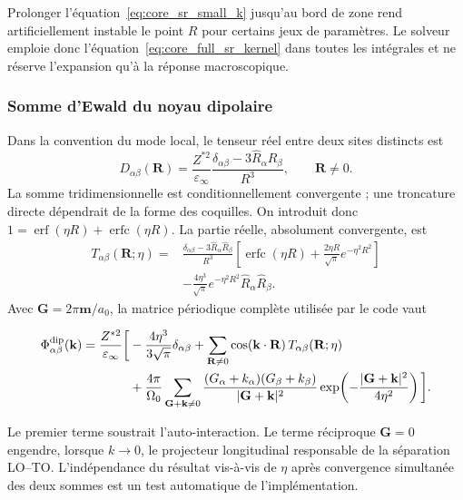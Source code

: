 Prolonger l'équation~\eqref{eq:core_sr_small_k} jusqu'au bord de zone rend
artificiellement instable le point $R$ pour certains jeux de paramètres. Le
solveur emploie donc l'équation~\eqref{eq:core_full_sr_kernel} dans toutes les
intégrales et ne réserve l'expansion qu'à la réponse macroscopique.

\subsubsection{Somme d'Ewald du noyau dipolaire}
\label{sec:core_dipolar_kernel}

Dans la convention du mode local, le tenseur réel entre deux sites distincts
est
\begin{equation}
D_{\alpha\beta}(\mathbf R)
=\frac{Z^{*2}}{\varepsilon_\infty}
\frac{\delta_{\alpha\beta}-3\widehat R_\alpha\widehat R_\beta}{R^3},
\qquad \mathbf R\ne0.
\label{eq:core_real_dipole}
\end{equation}
La somme tridimensionnelle est conditionnellement convergente ; une troncature
directe dépendrait de la forme des coquilles. On introduit donc
$1=\operatorname{erf}(\eta R)+\operatorname{erfc}(\eta R)$. La partie réelle,
absolument convergente, est
\begin{equation}
\begin{aligned}
T_{\alpha\beta}(\mathbf R;\eta)={}&
\frac{\delta_{\alpha\beta}-3\widehat R_\alpha\widehat R_\beta}{R^3}
\left[\operatorname{erfc}(\eta R)
+\frac{2\eta R}{\sqrt\pi}e^{-\eta^2R^2}\right]\\
&-\frac{4\eta^3}{\sqrt\pi}
e^{-\eta^2R^2}\widehat R_\alpha\widehat R_\beta .
\end{aligned}
\label{eq:core_ewald_real_tensor}
\end{equation}
Avec $\mathbf G=2\pi\mathbf m/a_0$, la matrice périodique complète utilisée par
le code vaut
\begin{mdframed}[linecolor=red!60!black,nobreak=true]
\small
\begin{equation}
\begin{aligned}
\Phi^{\rm dip}_{\alpha\beta}(\mathbf k)
=\frac{Z^{*2}}{\varepsilon_\infty}\bigg[
&-\frac{4\eta^3}{3\sqrt\pi}\delta_{\alpha\beta}
+\sum_{\mathbf R\ne0}\cos(\mathbf k\cdot\mathbf R)\,
T_{\alpha\beta}(\mathbf R;\eta)\\
&+\frac{4\pi}{\Omega_0}
\sum_{\mathbf G+\mathbf k\ne0}
\frac{(G_\alpha+k_\alpha)(G_\beta+k_\beta)}
{|\mathbf G+\mathbf k|^2}
\exp\!\left(-\frac{|\mathbf G+\mathbf k|^2}{4\eta^2}\right)
\bigg].
\end{aligned}
\label{eq:core_periodic_ewald_kernel}
\end{equation}
\end{mdframed}
Le premier terme soustrait l'auto-interaction. Le terme réciproque
$\mathbf G=0$ engendre, lorsque $k\to0$, le projecteur longitudinal responsable
de la séparation LO--TO. L'indépendance du résultat vis-à-vis de $\eta$ après
convergence simultanée des deux sommes est un test automatique de
l'implémentation.

